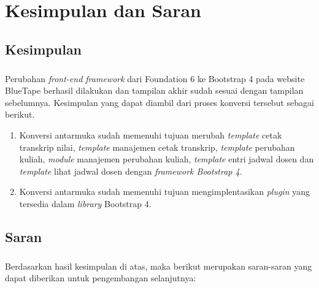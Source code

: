 \chapter{Kesimpulan dan Saran}
\section{Kesimpulan}
\paragraph{} Perubahan \textit{front-end framework} dari Foundation 6 ke Bootstrap 4 pada website BlueTape berhasil dilakukan dan tampilan akhir sudah sesuai dengan tampilan sebelumnya. Kesimpulan yang dapat diambil dari proses konversi tersebut sebagai berikut. 
\begin{enumerate}
	\item Konversi antarmuka sudah memenuhi tujuan merubah \textit{template} cetak transkrip nilai, \textit{template} manajemen cetak transkrip, \textit{template} perubahan kuliah, \textit{module} manajemen perubahan kuliah, \textit{template} entri jadwal dosen dan \textit{template} lihat jadwal dosen dengan \textit{framework Bootstrap 4}.
	\item Konversi antarmuka sudah memenuhi tujuan mengimplentasikan \textit{plugin} yang tersedia dalam \textit{library} Bootstrap 4.
\end{enumerate}

\section{Saran}
\paragraph{}Berdasarkan hasil kesimpulan di atas, maka berikut merupakan saran-saran yang dapat diberikan untuk pengembangan selanjutnya: